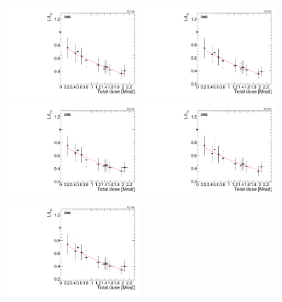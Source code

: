 \begin{figure}[tbp!]
\centering
\includegraphics[width=0.45\textwidth]{figures/SCSN81-F-20p8cm-f2ch0-dose.pdf}
\includegraphics[width=0.45\textwidth]{figures/SCSN81-F-20p8cm-f4ch1-dose.pdf}
\includegraphics[width=0.45\textwidth]{figures/SCSN81-F-20p8cm-f15ch2-dose.pdf}
\includegraphics[width=0.45\textwidth]{figures/SCSN81-F-20p8cm-f15ch3-dose.pdf}
\includegraphics[width=0.45\textwidth]{figures/SCSN81-F-20p8cm-f20ch2-dose.pdf}

\end{figure}
